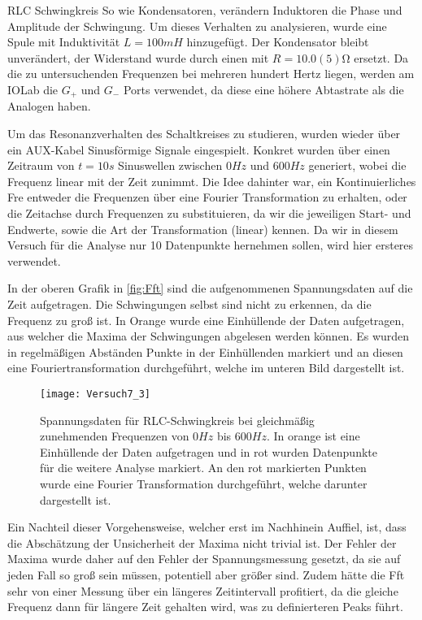\documentclass{alex_gp}
\begin{document}
\begin{mybox}{RLC Schwingkreis}
	So wie Kondensatoren, verändern Induktoren die Phase und Amplitude der Schwingung. Um dieses Verhalten zu analysieren, wurde eine Spule mit Induktivität \( L = 100 \unit{mH} \) hinzugefügt. Der Kondensator bleibt unverändert, der Widerstand wurde durch einen mit \( R = 10.0(5) \unit{\ohm} \) ersetzt. Da die zu untersuchenden Frequenzen bei mehreren hundert Hertz liegen, werden am IOLab die \( G_+ \) und \( G_- \) Ports verwendet, da diese eine höhere Abtastrate als die Analogen haben. 
	
	Um das Resonanzverhalten des Schaltkreises zu studieren, wurden wieder über ein AUX-Kabel Sinusförmige Signale eingespielt. Konkret wurden über einen Zeitraum von \( t = 10 \unit{s} \) Sinuswellen zwischen \( 0 \unit{Hz} \) und \( 600 \unit{Hz} \) generiert, wobei die Frequenz linear mit der Zeit zunimmt. Die Idee dahinter war, ein Kontinuierliches Fre
	entweder die Frequenzen über eine Fourier Transformation zu erhalten, oder die Zeitachse durch Frequenzen zu substituieren, da wir die jeweiligen Start- und Endwerte, sowie die Art der Transformation (linear) kennen. Da wir in diesem Versuch für die Analyse nur 10 Datenpunkte hernehmen sollen, wird hier ersteres verwendet. 
	
	In der oberen Grafik in \autoref{fig:Fft} sind die aufgenommenen Spannungsdaten auf die Zeit aufgetragen. Die Schwingungen selbst sind nicht zu erkennen, da die Frequenz zu groß ist. In Orange wurde eine Einhüllende der Daten aufgetragen, aus welcher die Maxima der Schwingungen abgelesen werden können. Es wurden in regelmäßigen Abständen Punkte in der Einhüllenden markiert und an diesen eine Fouriertransformation durchgeführt, welche im unteren Bild dargestellt ist. 
	\begin{figure}[H]	
		\centering
		\texttt{[image: Versuch7\_3]}
		\caption{Spannungsdaten für RLC-Schwingkreis bei gleichmäßig zunehmenden Frequenzen von \( 0 \unit{Hz} \) bis \( 600 \unit{Hz} \). In orange ist eine Einhüllende der Daten aufgetragen und in rot wurden Datenpunkte für die weitere Analyse markiert. An den rot markierten Punkten wurde eine Fourier Transformation durchgeführt, welche darunter dargestellt ist.}
		\label{fig:Fft}
	\end{figure}

	Ein Nachteil dieser Vorgehensweise, welcher erst im Nachhinein Auffiel, ist, dass die Abschätzung der Unsicherheit der Maxima nicht trivial ist. Der Fehler der Maxima wurde daher auf den Fehler der Spannungsmessung gesetzt, da sie auf jeden Fall so groß sein müssen, potentiell aber größer sind. Zudem hätte die Fft sehr von einer Messung über ein längeres Zeitintervall profitiert, da die gleiche Frequenz dann für längere Zeit gehalten wird, was zu definierteren Peaks führt. 
	

\end{mybox}
\end{document}
